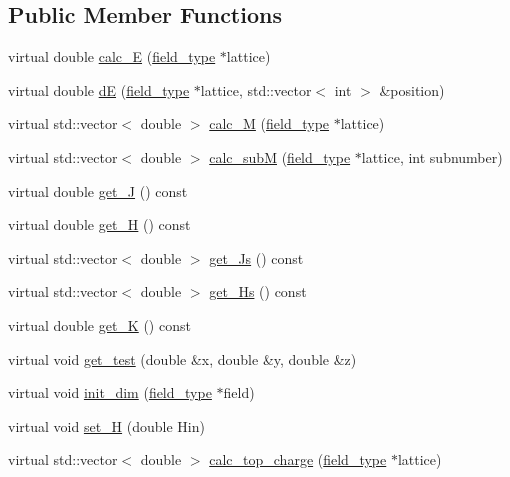 \subsection*{Public Member Functions}
\begin{DoxyCompactItemize}
\item 
virtual double \hyperlink{classham__type_a7fda5d3158544255ce3ca5e20c4e1c19}{calc\+\_\+E} (\hyperlink{classfield__type}{field\+\_\+type} $\ast$lattice)
\item 
virtual double \hyperlink{classham__type_a809902357229189b08ee9fdfab9c90be}{dE} (\hyperlink{classfield__type}{field\+\_\+type} $\ast$lattice, std\+::vector$<$ int $>$ \&position)
\item 
virtual std\+::vector$<$ double $>$ \hyperlink{classham__type_a953ba4332e88ee644d2afb96cd5a0ad5}{calc\+\_\+M} (\hyperlink{classfield__type}{field\+\_\+type} $\ast$lattice)
\item 
virtual std\+::vector$<$ double $>$ \hyperlink{classham__type_a37cc0a51074bd64cdeec866edb6f6015}{calc\+\_\+subM} (\hyperlink{classfield__type}{field\+\_\+type} $\ast$lattice, int subnumber)
\item 
virtual double \hyperlink{classham__type_ab75b9c6ea8098ea0874781a70bfa5099}{get\+\_\+J} () const 
\item 
virtual double \hyperlink{classham__type_a1c1a0ee7708f3d6f68bc999491dde42b}{get\+\_\+H} () const 
\item 
virtual std\+::vector$<$ double $>$ \hyperlink{classham__type_accdb77a4f5af92232a0415212d302344}{get\+\_\+\+Js} () const 
\item 
virtual std\+::vector$<$ double $>$ \hyperlink{classham__type_aab0cee1eece99ec37122126e7e4bcb91}{get\+\_\+\+Hs} () const 
\item 
virtual double \hyperlink{classham__type_a53ca8fb35d66cd07c78e24414b54d17f}{get\+\_\+K} () const 
\item 
virtual void \hyperlink{classham__type_a2864138405e794dc2aa2fe45fb6e400f}{get\+\_\+test} (double \&x, double \&y, double \&z)
\item 
virtual void \hyperlink{classham__type_a3a14214575bf8dcf3a8b39c7470dfe66}{init\+\_\+dim} (\hyperlink{classfield__type}{field\+\_\+type} $\ast$field)
\item 
virtual void \hyperlink{classham__type_a140c53e29c5c298c0f2704a4ecda7022}{set\+\_\+H} (double Hin)
\item 
virtual std\+::vector$<$ double $>$ \hyperlink{classham__type_ab6917097da83d4855efe2238ab4df4da}{calc\+\_\+top\+\_\+charge} (\hyperlink{classfield__type}{field\+\_\+type} $\ast$lattice)
\end{DoxyCompactItemize}
